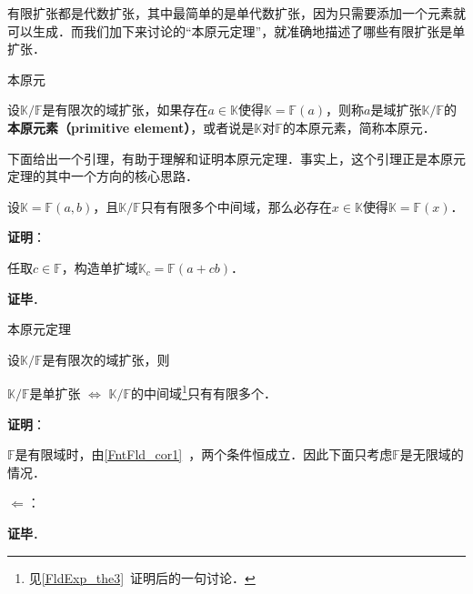 


有限扩张都是代数扩张，其中最简单的是单代数扩张，因为只需要添加一个元素就可以生成．而我们加下来讨论的“本原元定理”，就准确地描述了哪些有限扩张是单扩张．

\begin{definition}{本原元}

设$\mathbb{K}/\mathbb{F}$是有限次的域扩张，如果存在$a\in\mathbb{K}$使得$\mathbb{K}=\mathbb{F}(a)$，则称$a$是域扩张$\mathbb{K}/\mathbb{F}$的\textbf{本原元素（primitive element）}，或者说是$\mathbb{K}$对$\mathbb{F}$的本原元素，简称本原元．

\end{definition}

下面给出一个引理，有助于理解和证明本原元定理．事实上，这个引理正是本原元定理的其中一个方向的核心思路．


\begin{lemma}{}
设$\mathbb{K}=\mathbb{F}(a, b)$，且$\mathbb{K}/\mathbb{F}$只有有限多个中间域，那么必存在$x\in\mathbb{K}$使得$\mathbb{K}=\mathbb{F}(x)$．
\end{lemma}

\textbf{证明}：

任取$c\in\mathbb{F}$，构造单扩域$\mathbb{K}_c=\mathbb{F}(a+cb)$．

\textbf{证毕}．



\begin{theorem}{本原元定理}

设$\mathbb{K}/\mathbb{F}$是有限次的域扩张，则

$\mathbb{K}/\mathbb{F}$是单扩张 $\iff$ $\mathbb{K}/\mathbb{F}$的中间域\footnote{见\autoref{FldExp_the3}~证明后的一句讨论．}只有有限多个．

\end{theorem}

\textbf{证明}：

$\mathbb{F}$是有限域时，由\autoref{FntFld_cor1}~，两个条件恒成立．因此下面只考虑$\mathbb{F}$是无限域的情况．

$\Leftarrow$：



\textbf{证毕}．
































